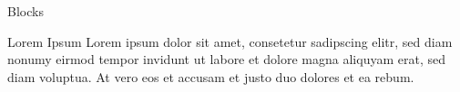 \documentclass[t,english]{beamer}
\begin{document}
\begin{frame}{Blocks}

\begin{block}{Lorem Ipsum}
Lorem ipsum dolor sit amet, consetetur sadipscing elitr, sed diam nonumy eirmod
tempor invidunt ut labore et dolore magna aliquyam erat, sed diam voluptua. At
vero eos et accusam et justo duo dolores et ea rebum.
\end{block}

\end{frame}
\end{document}
